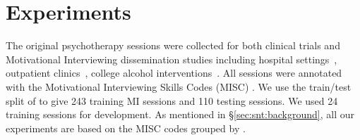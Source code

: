 \section{Experiments}
\label{sec:snt:experiments}

The original psychotherapy sessions were collected for both clinical
trials and Motivational Interviewing dissemination studies including
hospital settings~\citep{roy2014brief}, outpatient
clinics~\citep{baer2009agency}, college alcohol
interventions~\citep{tollison2008questions, neighbors2012randomized,
  lee2013indicated, lee2014randomized}.  All sessions were annotated
with the Motivational Interviewing Skills Codes (MISC)
\cite{atkins2014scaling}.  We use the train/test split of
\citet{can2015dialog, tanana2016comparison} to give 243 training MI
sessions and 110 testing sessions. We used 24 training sessions for
development.
As mentioned in \S\ref{sec:snt:background}, all our experiments are
based on the MISC codes grouped by \citet{xiao2016behavioral}.







